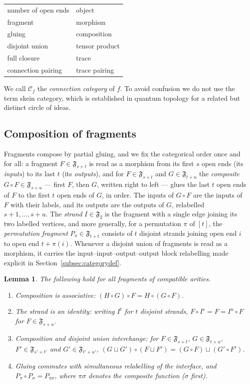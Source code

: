 \documentclass[11pt]{article}
\newtheorem{lemm}[theo]{Lemma}
\newcommand{\Frag}[1]{\mathfrak{F}_{#1}}          %
\newcommand{\strand}{I}                           %
\newcommand{\conncat}{\mathcal{C}_{f}}            %
\begin{document}
\begin{center}
\begin{tabular}{ll}
number of open ends & object\\
fragment & morphism\\
gluing & composition\\
disjoint union & tensor product\\
full closure & trace\\
connection pairing & trace pairing
\end{tabular}
\end{center}

We call $\conncat$ the \emph{connection category} of $f$. To avoid
confusion we do not use the term skein category, which is established
in quantum topology for a related but distinct circle of ideas.

\subsection{Composition of fragments}\label{subsec:composition}

Fragments compose by partial gluing, and we fix the categorical
order once and for all: a fragment $F\in\Frag{s+t}$ is read as a
morphism from its first $s$ open ends (its \emph{inputs}) to its
last $t$ (its \emph{outputs}), and for $F\in\Frag{s+t}$ and
$G\in\Frag{t+u}$ the \emph{composite} $G\circ F\in\Frag{s+u}$ ---
first $F$, then $G$, written right to left --- glues the last $t$
open ends of $F$ to the first $t$ open ends of $G$, in order. The
inputs of $G\circ F$ are the inputs of $F$ with their labels, and
its outputs are the outputs of $G$, relabelled
$s+1,\dotsc,s+u$. The \emph{strand}
$\strand\in\Frag{2}$ is the fragment with a single edge joining its
two labelled vertices, and more generally, for a permutation $\pi$ of
$[t]$, the \emph{permutation fragment} $P_{\pi}\in\Frag{t+t}$
consists of $t$ disjoint strands joining open end $i$ to open end
$t+\pi(i)$. Whenever a disjoint union of fragments is read as a
morphism, it carries the input--input--output--output block
relabelling made explicit in Section~\ref{subsec:categorydef}.

\begin{lemm}\label{lemm:gluingfacts}
The following hold for all fragments of compatible arities.
\begin{enumerate}
\item[(i)] Composition is associative:
  $(H\circ G)\circ F=H\circ(G\circ F)$.
\item[(ii)] The strand is an identity: writing $\strand^{t}$ for
  $t$ disjoint strands, $F\circ\strand^{s}=F=\strand^{u}\circ F$ for
  $F\in\Frag{s+u}$.
\item[(iii)] Composition and disjoint union interchange: for
  $F\in\Frag{s+t}$, $G\in\Frag{t+u}$, $F'\in\Frag{s'+t'}$ and
  $G'\in\Frag{t'+u'}$,
  $(G\sqcup G')\circ(F\sqcup F')=(G\circ F)\sqcup(G'\circ F')$.
\item[(iv)] Gluing commutes with simultaneous relabelling of the
  interface, and $P_{\pi}\circ P_{\sigma}=P_{\pi\sigma}$, where
  $\pi\sigma$ denotes the composite function ($\sigma$ first).
\end{enumerate}
\end{lemm}
\end{document}
